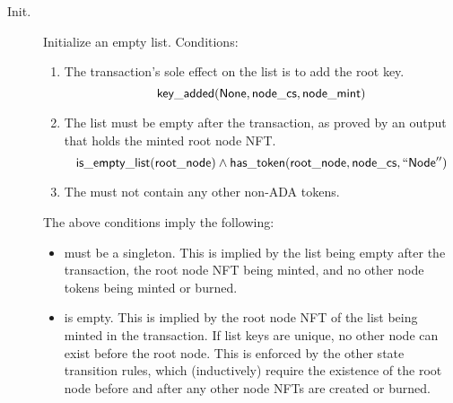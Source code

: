 \documentclass[../midgard.tex]{subfiles}
\begin{document}
\newcommand{\initSpendingValidatorWarning}[0]{
    \begin{warningblock}
        Offchain code for the list-initialization transaction MUST send the root node to the list's spending validator.
        Otherwise, the linked list can be corrupted.
    \end{warningblock}
}

\begin{description}
    \item[Init.] Initialize an empty list.
      Conditions:
        \begin{enumerate}
            \item The transaction's sole effect on the list is to add the root key.
                \begin{equation*}
                    \mathsf{key\_added}(\mathsf{None}, \mathsf{node\_cs}, \mathsf{node\_mint})
                \end{equation*}
            
            \item The list must be empty after the transaction, as proved by an output  that holds the minted root node NFT.
                \begin{equation*}
                    \mathsf{is\_empty\_list}(\mathsf{root\_node})  \land
                    \mathsf{has\_token}(\mathsf{root\_node}, \mathsf{node\_cs}, \mathsf{``Node''})
                \end{equation*}
            \item The  must not contain any other non-ADA tokens.
        \end{enumerate}
        The above conditions imply the following:
        \begin{itemize}
            \item {} must be a singleton.
              This is implied by the list being empty after the transaction, the root node NFT being minted, and no other node tokens being minted or burned.
            \item {} is empty.
              This is implied by the root node NFT of the list being minted in the transaction.
              If list keys are unique, no other node can exist before the root node.
              This is enforced by the other state transition rules, which (inductively) require the existence of the root node before and after any other node NFTs are created or burned.
        \end{itemize}
        

\end{description}
\end{document}
